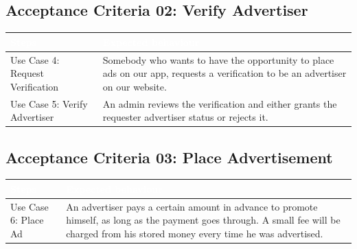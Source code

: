 \documentclass[12pt]{article}
\theoremstyle{definition}
\begin{document}
\subsection{Acceptance Criteria 02: Verify Advertiser}

\begin{tabular}{|p{.2\linewidth}|p{.65\linewidth}|}
\hline 
\cellcolor[gray]{0.5}\textcolor{white}{Steps} & \cellcolor[gray]{0.5}\textcolor{white}{Expected behaviour} \\ \hline Use Case 4: Request Verification &  Somebody who wants to have the opportunity to place ads on our app, requests a verification to be an advertiser on our website. \\ 
\hline Use Case 5: Verify Advertiser & An admin reviews the verification and either grants the requester advertiser status or rejects it. \\ 
\hline
\end{tabular}


\subsection{Acceptance Criteria 03: Place Advertisement}
\begin{tabular}{|p{.2\linewidth}|p{.65\linewidth}|}
\hline 
\cellcolor[gray]{0.5}\textcolor{white}{Steps} & \cellcolor[gray]{0.5}\textcolor{white}{Expected behaviour} \\ \hline
Use Case 6: Place Ad & An advertiser pays a certain amount in advance to promote himself, as long as the payment goes through. A small fee will be charged from his stored money every time he was advertised. \\ \hline
\end{tabular}
\end{document}
